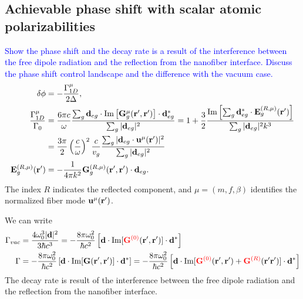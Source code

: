 \documentclass[preprint,aps,pra,onecolumn]{revtex4-1} %
\begin{document}

\subsection{Achievable phase shift with scalar atomic polarizabilities}

\textcolor{blue}{Show the phase shift and the decay rate is a result of the interference between the free dipole radiation and the reflection from the nanofiber interface. Discuss the phase shift control landscape and the difference with the vacuum case.}
\begin{align}
\delta\phi &= -\frac{\Gamma_{1D}^\mu}{2\Delta},\\
\frac{\Gamma_{1D}^\mu}{\Gamma_0} &= \frac{6\pi c}{\omega}\frac{\sum_g\mathbf{d}_{eg}\cdot \mathrm{Im}\left[\mathbf{G}_g^\mu(\mathbf{r}',\mathbf{r}') \right]\cdot\mathbf{d}_{eg}^* }{\sum_g|\mathbf{d}_{eg}|^2} = 1+ \frac{3}{2} \frac{\mathrm{Im}\left[\sum_g\mathbf{d}_{eg}^*\cdot \mathbf{E}^{(R,\mu)}_g(\mathbf{r}') \right]}{\sum_g|\mathbf{d}_{eg}|^2 k^3}\nonumber\\
&=\frac{3\pi}{2}\left(\frac{c}{\omega}\right)^2\frac{c}{v_g} \frac{\sum_{g}|\mathbf{d}_{eg}\cdot \mathbf{u}^\mu(\mathbf{r}')|^2}{\sum_g|\mathbf{d}_{eg}|^2}\\
\mathbf{E}^{(R,\mu)}_g(\mathbf{r}') &= -\frac{1}{4\pi k^2} \mathbf{G}^{(R,\mu)}_g(\mathbf{r}',\mathbf{r}')\cdot \mathbf{d}_{eg}.
\end{align}
The index $ R $ indicates the reflected component, and $\mu=(m,f,\beta)  $ identifies the normalized fiber mode $ \mathbf{u}^\mu(\mathbf{r}') $. 

We can write 
\begin{align}
\Gamma_{vac} &= \frac{4\omega_0^3|\mathbf{d}|^2}{3\hbar c^3}=-\frac{8\pi \omega_0^2}{\hbar c^2}\left[ \mathbf{d}\cdot \mathrm{Im}[\mathbin{\color{red}{\mathbf{G}^{(0)}}}(\mathbf{r}',\mathbf{r}')]\cdot \mathbf{d}^* \right]\\
\Gamma &= -\frac{8\pi \omega_0^2}{\hbar c^2}\left[ \mathbf{d}\cdot \mathrm{Im}[\mathbf{G}(\mathbf{r}',\mathbf{r}')]\cdot \mathbf{d}^* \right]=-\frac{8\pi \omega_0^2}{\hbar c^2}\left[ \mathbf{d}\cdot \mathrm{Im}[\mathbin{\color{red}{\mathbf{G}^{(0)}}}(\mathbf{r}',\mathbf{r}')+\mathbin{\color{red}{\mathbf{G}^{(R)}}}(\mathbf{r}'\mathbf{r}')]\cdot \mathbf{d}^* \right]\\
\end{align}
The decay rate is result of the interference between the free dipole radiation and the reflection from the nanofiber interface.
\end{document}
